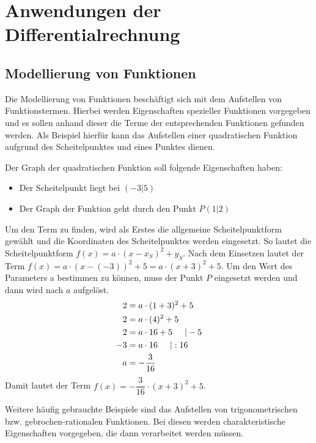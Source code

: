  \section{Anwendungen der Differentialrechnung}
 \subsection{Modellierung von Funktionen}
 Die Modellierung von Funktionen beschäftigt sich mit dem Aufstellen von Funktionstermen. Hierbei werden Eigenschaften spezieller Funktionen vorgegeben und es sollen anhand dieser die Terme der entsprechenden Funktionen gefunden werden. Als Beispiel hierfür kann das Aufstellen einer quadratischen Funktion aufgrund des Scheitelpunktes und eines Punktes dienen.
 \begin{bsp}{}{}
Der Graph der quadratischen Funktion soll folgende Eigenschaften haben:
\begin{itemize}
    \item Der Scheitelpunkt liegt bei $(-3|5)$
    \item Der Graph der Funktion geht durch den Punkt $P(1|2)$
\end{itemize}
Um den Term zu finden, wird als Erstes die allgemeine Scheitelpunktform gewählt und die Koordinaten des Scheitelpunktes werden eingesetzt. So lautet die Scheitelpunktform $f(x) = a\cdot \left(x-x_S\right)^2 +y_S$. Nach dem Einsetzen lautet der Term $f(x) = a\cdot \left(x-(-3)\right)^2 +5 = a\cdot \left(x+3\right)^2 +5 $. Um den Wert des Parameters a bestimmen zu können, muss der Punkt $P$ eingesetzt werden und dann wird nach $a$ aufgelöst.
\begin{equation*}
    \begin{split}
        2&= a\cdot (1+3)^2+5\\
        2&= a\cdot (4)^2 +5\\
        2&= a\cdot 16 +5 \hspace{0.5cm} | - 5\\
        -3&= a\cdot 16  \hspace{0.5cm} | : 16\\
        a&=-\dfrac{3}{16}
    \end{split}
\end{equation*}
Damit lautet der Term $f(x) = -\dfrac{3}{16} \cdot \left(x+3\right)^2 +5$.
 \end{bsp}
 Weitere häufig gebrauchte Beispiele sind das Aufstellen von trigonometrischen bzw. gebrochen-rationalen Funktionen. Bei diesen werden charakteristische Eigenschaften vorgegeben, die dann verarbeitet werden müssen. 
